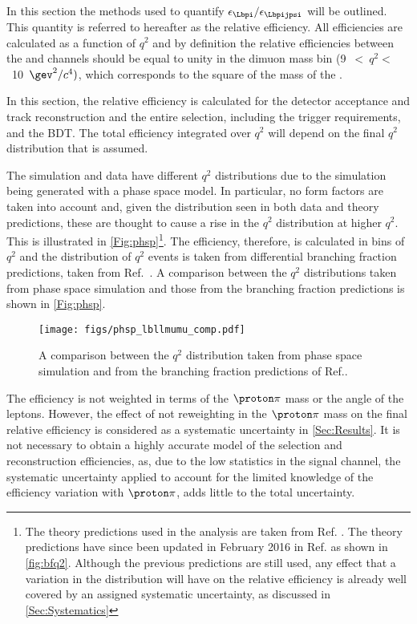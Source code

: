 In this section the methods used to quantify $\epsilon_{\Lbpi}/\epsilon_{\Lbpijpsi}$ will be outlined. This quantity is referred to hereafter as the relative efficiency. All efficiencies are calculated as a function of $q^{2}$ and by definition the relative efficiencies between the \Lbpi and \Lbpijpsi channels should be equal to unity in the dimuon mass bin (9~$<~q^{2}<$~10~$\gev^{2}/c^{4})$, which corresponds to the square of the  mass of the \jpsi.

In this section, the relative efficiency is calculated for the detector acceptance and track reconstruction and the entire selection, including the trigger requirements, and the BDT. The total efficiency integrated over $q^{2}$ will depend on the final $q^{2}$ distribution that is assumed. 


The simulation and data have different $q^{2}$ distributions due to the simulation being generated with a phase space model. In particular, no form factors are taken into account and, given the distribution seen in both \LbL data and theory predictions, these are thought to cause a rise in the $q^{2}$ distribution at higher $q^{2}$. This is illustrated in \autoref{Fig:phsp}\footnote{The \LbL theory predictions used in the analysis are taken from Ref. \cite{Meinel}. The theory predictions have since been updated in February 2016 in Ref.\cite{Detmold:2016pkz} as shown in \autoref{fig:bfq2}. Although the previous predictions are still used, any effect that a variation in the \qsq distribution will have on the relative efficiency is already well covered by an assigned systematic uncertainty, as discussed in \autoref{Sec:Systematics}}. The efficiency, therefore, is calculated in bins of $q^{2}$ and the distribution of $q^{2}$ events is taken from \LbL differential branching fraction predictions, taken from Ref.~\cite{Meinel}. A comparison between the $q^{2}$ distributions taken from phase space simulation and those from the \LbL branching fraction predictions is shown in \autoref{Fig:phsp}.

\begin{figure}[h!]
  \def\nh{0.7\textwidth}
  \centering
  \texttt{[image: figs/phsp\_lbllmumu\_comp.pdf]}
  \caption{A comparison between the $q^{2}$ distribution taken from phase space simulation and from the \LbL branching fraction predictions of Ref.\cite{Meinel}.}
  \label{Fig:phsp}
\end{figure}
%

The efficiency is not weighted in terms of the $\proton \pi$ mass or the angle of the leptons. However, the effect of not reweighting in the $\proton \pi$ mass on the final relative efficiency is considered as a systematic uncertainty in \autoref{Sec:Results}. It is not necessary to obtain a highly accurate model of the selection and reconstruction efficiencies, as, due to the low statistics in the signal channel, the systematic uncertainty applied to account for the limited knowledge of the efficiency variation with $\proton \pi$,  adds little to the total uncertainty. %


